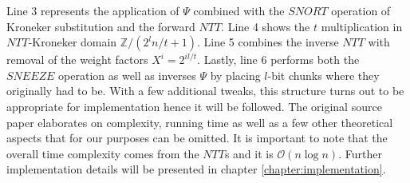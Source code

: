 Line 3 represents the application of $\Psi$ combined with the $SNORT$ operation of Kroneker substitution and the forward $NTT$. Line 4 shows the $t$ multiplication in $NTT$-Kroneker domain $\mathbb{Z} / (2^ln/t + 1)$. Line 5 combines the inverse $NTT$ with removal of the weight factors $X^i = 2^{il/t}$. Lastly, line 6 performs both the $SNEEZE$ operation as well as inverses $\Psi$ by placing $l$-bit chunks where they originally had to be. With a few additional tweaks, this structure turns out to be appropriate for implementation hence it will be followed. The original source paper \parencite{cryptoeprint:2020/1303} elaborates on complexity, running time as well as a few other theoretical aspects that for our purposes can be omitted. It is important to note that the overall time complexity comes from the $NTT$s and it is $\mathcal{O}(n \log n)$. Further implementation details will be presented in chapter \ref{chapter:implementation}.











